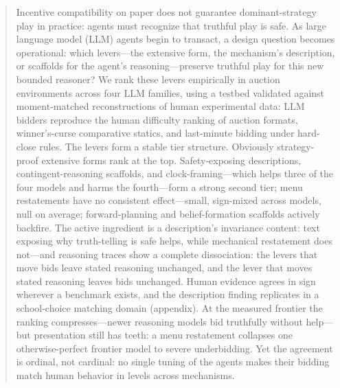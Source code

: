 \begin{abstract}
Incentive compatibility on paper does not guarantee dominant-strategy play in practice: agents must recognize that truthful play is safe. As large language model (LLM) agents begin to transact, a design question becomes operational: which levers---the extensive form, the mechanism's description, or scaffolds for the agent's reasoning---preserve truthful play for this new bounded reasoner? We rank these levers empirically in auction environments across four LLM families, using a testbed validated against moment-matched reconstructions of human experimental data: LLM bidders reproduce the human difficulty ranking of auction formats, winner's-curse comparative statics, and last-minute bidding under hard-close rules. The levers form a stable tier structure. Obviously strategy-proof extensive forms rank at the top. Safety-exposing descriptions, contingent-reasoning scaffolds, and clock-framing---which helps three of the four models and harms the fourth---form a strong second tier; menu restatements have no consistent effect---small, sign-mixed across models, null on average; forward-planning and belief-formation scaffolds actively backfire. The active ingredient is a description's invariance content: text exposing why truth-telling is safe helps, while mechanical restatement does not---and reasoning traces show a complete dissociation: the levers that move bids leave stated reasoning unchanged, and the lever that moves stated reasoning leaves bids unchanged. Human evidence agrees in sign wherever a benchmark exists, and the description finding replicates in a school-choice matching domain (appendix). At the measured frontier the ranking compresses---newer reasoning models bid truthfully without help---but presentation still has teeth: a menu restatement collapses one otherwise-perfect frontier model to severe underbidding. Yet the agreement is ordinal, not cardinal: no single tuning of the agents makes their bidding match human behavior in levels across mechanisms.
\end{abstract}
